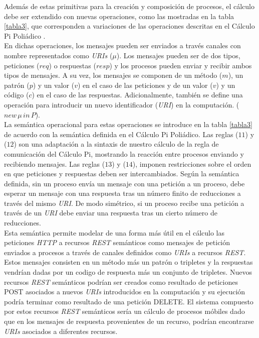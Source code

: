 Adem\'as de estas primitivas para la creaci\'on y composici\'on de procesos, el c\'alculo debe ser extendido con nuevas operaciones, como las mostradas en la tabla \ref{tabla3}, que corresponden a variaciones de las operaciones descritas en el C\'alculo Pi Poli\'adico \cite{polyadic_pi}.\\
En dichas operaciones, los mensajes pueden ser enviados a trav\'es canales con nombre representados como \textit{URIs} ($\mu$). Los mensajes pueden ser de dos tipos, peticiones ($req$) o respuestas ($resp$) y los procesos pueden enviar y recibir ambos tipos de mensajes. A su vez, los mensajes se componen de un m\'etodo ($m$), un patr\'on ($p$) y un valor ($v$) en el caso de las peticiones y de un valor ($v$) y un c\'odigo ($c$) en el caso de las respuestas. Adicionalmente, tambi\'en se define una operaci\'on para introducir un nuevo identificador (\textit{URI}) en la computaci\'on. ($new\, \mu\, in\,P$).\\
La sem\'antica operacional para estas operaciones se introduce en la tabla \ref{tabla3} de acuerdo con la sem\'antica definida en el C\'alculo Pi Poli\'adico. Las reglas ($11$) y ($12$) son una adaptaci\'on a la sintaxis de nuestro c\'alculo de la regla de comunicaci\'on del C\'alculo Pi, mostrando la reacci\'on entre procesos enviando y recibiendo mensajes. Las reglas ($13$) y ($14$), imponen restricciones sobre el orden en que peticiones y respuestas deben ser intercambiados. Seg\'un la sem\'antica definida, sin un proceso env\'ia un mensaje con una petici\'on a un proceso, debe esperar un mensaje con una respuesta  tras un n\'umero finito de reducciones a trav\'es del mismo \textit{URI}. De modo sim\'etrico, si un proceso recibe una petici\'on a trav\'es de un \textit{URI} debe enviar una respuesta tras un cierto n\'umero de reducciones.\\

Esta sem\'antica permite modelar de una forma m\'as \'util en el c\'alculo las peticiones \textit{HTTP} a recursos \textit{REST} sem\'anticos como mensajes de petici\'on enviados a procesos a trav\'es de canales definidos como \textit{URIs} a recursos \textit{REST}. Estos mensajes consisten en un m\'etodo m\'as un patr\'on o tripletes y la respuestas vendr\'ian dadas por un codigo de respuesta m\'as un conjunto de tripletes. Nuevos recursos \textit{REST} sem\'anticos podr\'ian ser creados como resultado de peticiones POST asociados a nuevos \textit{URIs} introducidos en la computaci\'on y su ejecuci\'on podr\'ia terminar como resultado de una petici\'on DELETE. El sistema compuesto por estos recursos \textit{REST} sem\'anticos ser\'ia un c\'alculo de procesos m\'obiles dado que en los mensajes de respuesta provenientes de un recurso, podr\'ian encontrarse \textit{URIs} asociados a diferentes recursos.


